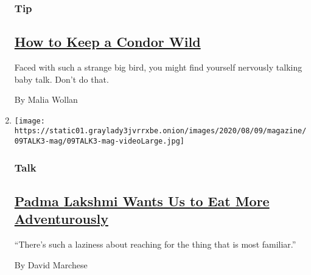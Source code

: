 \begin{enumerate}
  \hypertarget{tip}{%
  \subsubsection{Tip}\label{tip}}

  \hypertarget{how-to-keep-a-condor-wild}{%
  \subsection{\texorpdfstring{\href{/2020/08/04/magazine/condors-yurok-tribe.html}{How
  to Keep a Condor
  Wild}}{How to Keep a Condor Wild}}\label{how-to-keep-a-condor-wild}}

  Faced with such a strange big bird, you might find yourself nervously
  talking baby talk. Don't do that.

  By Malia Wollan
\item
  \texttt{[image: https://static01.graylady3jvrrxbe.onion/images/2020/08/09/magazine/09TALK3-mag/09TALK3-mag-videoLarge.jpg]}

  \hypertarget{talk}{%
  \subsubsection{Talk}\label{talk}}

  \hypertarget{padma-lakshmi-wants-us-to-eat-more-adventurously}{%
  \subsection{\texorpdfstring{\href{/interactive/2020/08/03/magazine/padma-lakshmi-interview.html}{Padma
  Lakshmi Wants Us to Eat More
  Adventurously}}{Padma Lakshmi Wants Us to Eat More Adventurously}}\label{padma-lakshmi-wants-us-to-eat-more-adventurously}}

  ``There's such a laziness about reaching for the thing that is most
  familiar.''

  By David Marchese
\end{enumerate}

